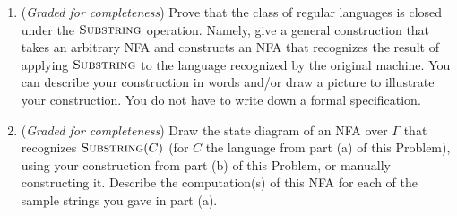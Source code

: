 \documentclass[12pt, oneside]{article}
\newcommand{\gradeComplete}{({\it Graded for completeness}) }
\newcommand{\SUBSTRING}{\textsc{Substring}}
\begin{document}
\begin{enumerate}
\begin{enumerate}
\begin{center}
\end{center}
We'll call the language recognized by the NFA above $C$.
Fill in the blanks below: 
\begin{itemize}
    \item An example of a string over $\Gamma$ that is in $C$
    {\bf and} is in $\SUBSTRING(C)$ is \underline{\phantom{\hspace{1in}}} because 
    \underline{\phantom{\hspace{1in}}}
    \item An example of a string over $\Gamma$ that is in $C$
    {\bf and} is {\bf not} in $\SUBSTRING(C)$ is \underline{\phantom{\hspace{1in}}} because 
    \underline{\phantom{\hspace{1in}}}
    \item An example of a string over $\Gamma$ that is {\bf not} in $C$
    {\bf and} is in $\SUBSTRING(C)$ is \underline{\phantom{\hspace{1in}}} because 
    \underline{\phantom{\hspace{1in}}}
    \item An example of a string over $\Gamma$ that is {\bf not} in $C$
    {\bf and} is {\bf not} in $\SUBSTRING(C)$ is \underline{\phantom{\hspace{1in}}} because 
    \underline{\phantom{\hspace{1in}}}
\end{itemize}
For each item, you'll either fill in a specific string 
and a justification that refers back to the relevant 
definitions, or you'll write ``impossible'' for the first 
part of the sentence and justify why it's impossible to find such 
an example referring back to the relevant definitions.
\item\gradeComplete Prove 
that the class of regular languages is closed under the $\SUBSTRING$ operation. Namely, give a general construction 
that takes an arbitrary NFA and constructs
 an NFA that recognizes the result of applying $\SUBSTRING$
 to the language recognized by the original machine. 
You can describe your construction in words and/or
draw a picture to illustrate your construction.
You do not have to write down a formal specification.

\item\gradeComplete Draw the state diagram of an 
NFA over $\Gamma$ that recognizes $\SUBSTRING(C)$ (for 
$C$ the language from part (a) of this Problem), using
your construction from part (b) of this Problem, or manually
constructing it. 
Describe the computation(s) of this NFA for each of the 
sample strings you gave in part (a).
\end{enumerate}


\end{enumerate}
\end{document}
